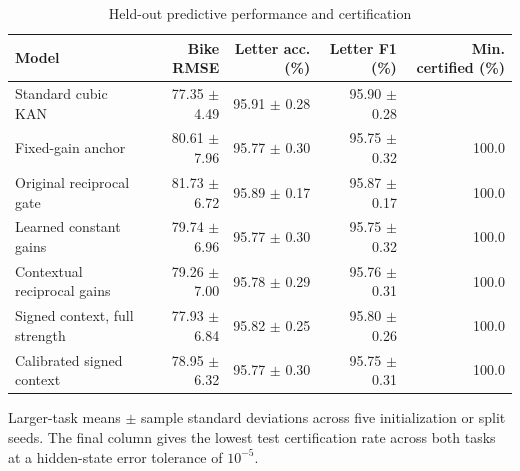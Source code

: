 \begin{table}[t]
\centering
\small
\caption{Held-out predictive performance and certification}
\label{tab:main_results}
\begin{tabular}{@{}lrrrr@{}}
\toprule
\textbf{Model} & \textbf{Bike RMSE} & \textbf{Letter acc. (\%)} & \textbf{Letter F1 (\%)} & \textbf{Min. certified (\%)} \\
\midrule
Standard cubic KAN & 77.35 \ensuremath{\pm} 4.49 & 95.91 \ensuremath{\pm} 0.28 & 95.90 \ensuremath{\pm} 0.28 & \textemdash{} \\
Fixed-gain anchor & 80.61 \ensuremath{\pm} 7.96 & 95.77 \ensuremath{\pm} 0.30 & 95.75 \ensuremath{\pm} 0.32 & 100.0 \\
Original reciprocal gate & 81.73 \ensuremath{\pm} 6.72 & 95.89 \ensuremath{\pm} 0.17 & 95.87 \ensuremath{\pm} 0.17 & 100.0 \\
Learned constant gains & 79.74 \ensuremath{\pm} 6.96 & 95.77 \ensuremath{\pm} 0.30 & 95.75 \ensuremath{\pm} 0.32 & 100.0 \\
Contextual reciprocal gains & 79.26 \ensuremath{\pm} 7.00 & 95.78 \ensuremath{\pm} 0.29 & 95.76 \ensuremath{\pm} 0.31 & 100.0 \\
Signed context, full strength & 77.93 \ensuremath{\pm} 6.84 & 95.82 \ensuremath{\pm} 0.25 & 95.80 \ensuremath{\pm} 0.26 & 100.0 \\
Calibrated signed context & 78.95 \ensuremath{\pm} 6.32 & 95.77 \ensuremath{\pm} 0.30 & 95.75 \ensuremath{\pm} 0.31 & 100.0 \\
\bottomrule
\end{tabular}
\par\medskip
\begin{minipage}{0.98\linewidth}\footnotesize Larger-task means \ensuremath{\pm} sample standard deviations across five initialization or split seeds. The final column gives the lowest test certification rate across both tasks at a hidden-state error tolerance of \ensuremath{10^{-5}}.\end{minipage}
\end{table}
